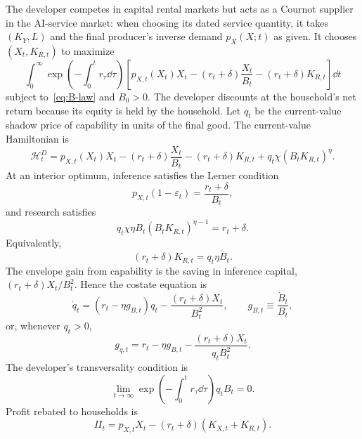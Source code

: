 The developer competes in capital rental markets but acts as a Cournot supplier in the AI-service market: when choosing its dated service quantity, it takes $(K_Y,L)$ and the final producer's inverse demand $p_X(X;t)$ as given. It chooses $(X_t,K_{R,t})$ to maximize
\begin{equation}
 \int_0^\infty
 \exp\!\left(-\int_0^t r_\tau\dd\tau\right)
 \left[p_{X,t}(X_t)X_t-(r_t+\delta)\frac{X_t}{B_t}
 -(r_t+\delta)K_{R,t}\right]\dd t
 \label{eq:developer-objective}
\end{equation}
subject to~\eqref{eq:B-law} and $B_0>0$. The developer discounts at the household's net return because its equity is held by the household. Let $q_t$ be the current-value shadow price of capability in units of the final good. The current-value Hamiltonian is
\begin{equation}
 \mathcal H_t^D=p_{X,t}(X_t)X_t
 -(r_t+\delta)\frac{X_t}{B_t}
 -(r_t+\delta)K_{R,t}+q_t\chi(B_tK_{R,t})^\eta.
 \label{eq:developer-Hamiltonian}
\end{equation}
At an interior optimum, inference satisfies the Lerner condition
\begin{equation}
 p_{X,t}(1-\varepsilon_t)=\frac{r_t+\delta}{B_t},
 \label{eq:monopoly-FOC}
\end{equation}
and research satisfies
\begin{equation}
 q_t\chi\eta B_t(B_tK_{R,t})^{\eta-1}=r_t+\delta.
 \label{eq:research-FOC}
\end{equation}
Equivalently,
\begin{equation}
 (r_t+\delta)K_{R,t}=q_t\eta\dot B_t.
 \label{eq:research-payment}
\end{equation}
The envelope gain from capability is the saving in inference capital,
$(r_t+\delta)X_t/B_t^2$. Hence the costate equation is
\begin{equation}
 \dot q_t=(r_t-\eta g_{B,t})q_t
 -\frac{(r_t+\delta)X_t}{B_t^2},
 \qquad g_{B,t}\equiv\frac{\dot B_t}{B_t},
 \label{eq:q-level}
\end{equation}
or, whenever $q_t>0$,
\begin{equation}
 g_{q,t}=r_t-\eta g_{B,t}
 -\frac{(r_t+\delta)X_t}{q_tB_t^2}.
 \label{eq:q-growth}
\end{equation}
The developer's transversality condition is
\begin{equation}
 \lim_{t\to\infty}
 \exp\!\left(-\int_0^t r_\tau\dd\tau\right)q_tB_t=0.
 \label{eq:developer-TVC}
\end{equation}
Profit rebated to households is
\begin{equation}
 \Pi_t=p_{X,t}X_t-(r_t+\delta)(K_{X,t}+K_{R,t}).
 \label{eq:developer-profit}
\end{equation}

